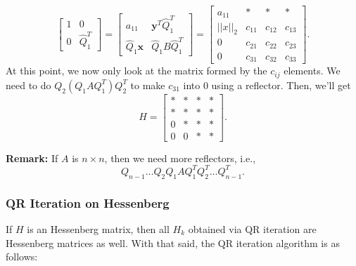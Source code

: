 \documentclass[letterpaper]{article}
\newcommand{\0}{\mathbf{0}}
\newcommand{\y}{\mathbf{y}}
\newcommand{\x}{\mathbf{x}}
\begin{document}
\begin{mdframed}
\[\begin{bmatrix}
        1 & 0 \\ 
        0 & \hat{Q}_1^T
    \end{bmatrix} = \begin{bmatrix}
        a_{11} & \y^T \hat{Q}_1^T \\ 
        \hat{Q}_1 \x & \hat{Q}_1 B \hat{Q}_1^T 
    \end{bmatrix} = \begin{bmatrix}
        a_{11} & * & * & * \\ 
        ||x||_2 & c_{11} & c_{12} & c_{13} \\ 
        0 & c_{21} & c_{22} & c_{23} \\ 
        0 & c_{31} & c_{32} & c_{33}
    \end{bmatrix}.\]
    At this point, we now only look at the matrix formed by the $c_{ij}$ elements. We need to do $Q_2(Q_1 A Q_1^T)Q_2^T$ to make $c_{31}$ into 0 using a reflector. Then, we'll get 
    \[H = \begin{bmatrix}
        * & * & * & * \\ 
        * & * & * & * \\ 
        0 & * & * & * \\ 
        0 & 0 & * & * 
    \end{bmatrix}.\]
\end{mdframed}
\textbf{Remark:} If $A$ is $n \times n$, then we need more reflectors, i.e., 
\[Q_{n - 1} \hdots Q_2 Q_1 A Q_1^T Q_2^T \hdots Q_{n - 1}^T.\]


\subsubsection{QR Iteration on Hessenberg}
If $H$ is an Hessenberg matrix, then all $H_k$ obtained via QR iteration are Hessenberg matrices as well. With that said, the QR iteration algorithm is as follows: 
\end{document}
